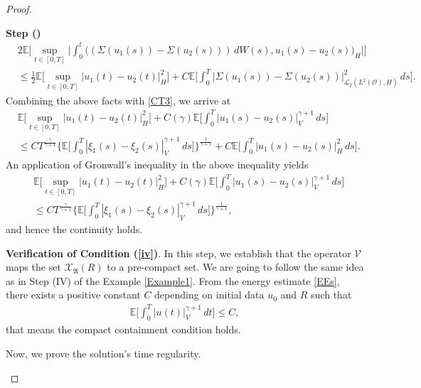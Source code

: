\documentclass[english,a4paper,11pt]{amsart}
\theoremstyle{plain}
\theoremstyle{definition}
\theoremstyle{remark}
\numberwithin{equation}{section}
\newcounter{lil1}
\newenvironment{step}
{\begin{list} { \bf Step (\Roman{lil1})}
		{ \usecounter{lil1}
			\setlength{\leftmargin}{0.0cm}
			\setlength{\topsep}{0.2cm}
			\setlength{\itemsep}{0.0cm}
			\setlength{\parsep}{0.1cm}
			\setlength{\itemindent}{0.8cm}
			\setlength{\parskip}{0.0cm}}}
	{\end{list}}
\newcounter{lil33}
\newcounter{lil1q}
\newcommand{\MA}{\mathfrak{A}}
\newcommand{\CO}{{{ \mathcal O }}}
\newcommand{\EE}{ \mathbb{E} }
\newcommand{\Vcal} {{\mathcal V}}
\newcommand{\Xcal} {{\mathcal X}}
\begin{document}
\begin{proof}
\begin{step}
\begin{align*}
	&2\EE\bigg[\sup_{t\in[0,T]}\bigg|\int_0^t\big((\Sigma(u_1(s))-\Sigma(u_2(s)))\, dW(s), u_1(s)-u_2(s)\big)_H \bigg|\bigg] \\&\leq 
	\frac{1}{2}\EE\bigg[\sup_{t\in[0,T]} | u_1(t)-u_2(t) | _H^2\bigg]+C \EE\bigg[\int_0^T | \Sigma(u_1(s))-\Sigma(u_2(s)) | _{\mathcal{L}_2(L^2(\CO),H)}^2\,ds  \bigg]. 
\end{align*}Combining the above facts with \eqref{CT3}, we arrive at 
\begin{align*}
&	\EE \bigg[\sup_{t\in[0,T]} | u_1(t)-u_2(t) | _H^2\bigg]+C(\gamma)\EE\bigg[ \int_0^T | u_1(s)-u_2(s) | _V^{\gamma+1}\,ds \bigg]
	\\&\nonumber
	\leq C T^{\frac{\gamma}{\gamma+1}} \bigg\{\EE\bigg[\int_0^T | \xi_1(s)-\xi_2(s) | _V^{\gamma+1}\,ds\bigg]\bigg\}^\frac{1}{\gamma+1}+C \EE\bigg[\int_0^T | u_1(s)-u_2(s) | _{H}^2\,ds\bigg].
\end{align*}An application of Gronwall's inequality in the above inequality yields
\begin{align*}
	&	\EE \bigg[\sup_{t\in[0,T]} | u_1(t)-u_2(t) | _H^2\bigg]+C(\gamma)\EE\bigg[ \int_0^T | u_1(s)-u_2(s) | _V^{\gamma+1}\,ds \bigg]
\\&	\leq C T^{\frac{\gamma}{\gamma+1}} \bigg\{\EE\bigg[\int_0^T | \xi_1(s)-\xi_2(s) | _V^{\gamma+1}\,ds\bigg]\bigg\}^\frac{1}{\gamma+1},
\end{align*}and hence the continuity holds.

\item \textbf{Verification of Condition (\ref{iv})}. In this step, we establish that the operator $\Vcal$ maps the set $\Xcal_{\MA}(R)$ to a pre-compact set. We are going to follow the same idea as in Step (IV) of the Example \ref{Example1}.
From the energy estimate \eqref{EEs}, there exists a positive constant $C$ depending on initial data $u_0$ and $R$ such that 
\begin{align*}
	\EE\bigg[\int_0^T|u(t)|_V^{\gamma+1}\,dt\bigg]\leq C, 
\end{align*}that means the compact containment condition holds.



Now, we prove the solution's time regularity.  


\end{step}
\end{proof}
\end{document}
